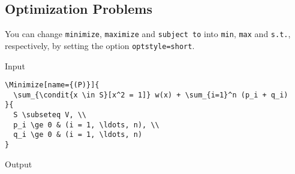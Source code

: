 \documentclass[a4paper, 11pt]{article}
\begin{document}
\subsection{Optimization Problems}

You can change \texttt{minimize}, \texttt{maximize} and \texttt{subject to} into \texttt{min}, \texttt{max} and \texttt{s.t.}, respectively, by setting the option \texttt{optstyle=short}.

\begin{itembox}[l]{Input}
  \begin{verbatim}
\Minimize[name={(P)}]{
  \sum_{\condit{x \in S}[x^2 = 1]} w(x) + \sum_{i=1}^n (p_i + q_i)
}{
  S \subseteq V, \\
  p_i \ge 0 & (i = 1, \ldots, n), \\
  q_i \ge 0 & (i = 1, \ldots, n)
}
\end{verbatim}
\end{itembox}

\begin{itembox}[l]{Output}
\end{itembox}
\end{document}
